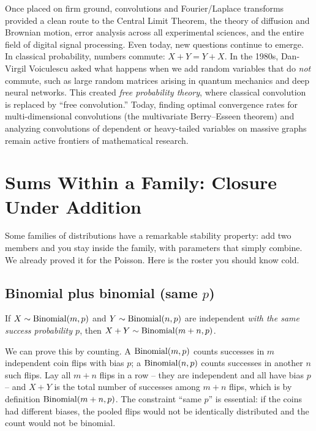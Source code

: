 \begin{historybox}
Once placed on firm ground, convolutions and Fourier/Laplace transforms
provided a clean route to the Central Limit Theorem, the theory of diffusion and Brownian
motion, error analysis across all experimental sciences, and the entire
field of digital signal processing. Even today, new questions continue to
emerge. In classical probability, numbers commute:
$X+Y = Y+X$. In the 1980s, Dan-Virgil Voiculescu asked what happens when we
add random variables that do \emph{not} commute, such as large random
matrices arising in quantum mechanics and deep neural networks. This
created \emph{free probability theory}, where classical convolution is
replaced by ``free convolution.'' Today, finding optimal convergence rates
for multi-dimensional convolutions (the multivariate Berry--Esseen theorem)
and analyzing convolutions of dependent or heavy-tailed variables on massive
graphs remain active frontiers of mathematical research.
\end{historybox}

\section{Sums Within a Family: Closure Under Addition}
\label{ch17:closure}

Some families of distributions have a remarkable stability property: add
two members and you stay inside the family, with parameters that simply
combine. We already proved it for the Poisson. Here is the roster you
should know cold.

\subsection{Binomial plus binomial (same \texorpdfstring{$p$}{p})}

\begin{theorem}
\label{ch17:thm-bin-add}
If $X\sim\operatorname{Binomial}(m,p)$ and $Y\sim\operatorname{Binomial}(n,p)$ are independent \emph{with the
same success probability $p$}, then $X+Y\sim\operatorname{Binomial}(m+n,p)$.
\end{theorem}

\begin{whybox}
We can prove this by counting. A $\operatorname{Binomial}(m,p)$ counts successes in $m$
independent coin flips with bias $p$; a $\operatorname{Binomial}(n,p)$ counts successes in
another $n$ such flips. Lay all $m+n$ flips in a row -- they are
independent and all have bias $p$ -- and $X+Y$ is the total number of
successes among $m+n$ flips, which is by definition $\operatorname{Binomial}(m+n,p)$. The
constraint ``same $p$'' is essential: if the coins had different biases,
the pooled flips would not be identically distributed and the count would
not be binomial.
\end{whybox}

